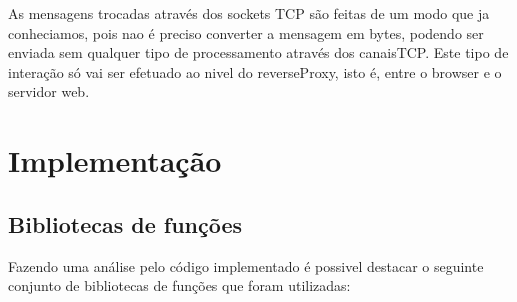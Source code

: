 \documentclass{llncs}
\begin{document}
		As mensagens trocadas através dos sockets TCP são feitas de um modo que ja conheciamos, pois nao é preciso converter a mensagem em bytes, podendo ser enviada sem qualquer tipo de processamento através dos canaisTCP. Este tipo de interação só vai ser efetuado ao nivel do reverseProxy, isto é, entre o browser e o servidor web.




\section{Implementação}
	
	\subsection{Bibliotecas de funções}

		Fazendo uma análise pelo código implementado é possivel destacar o seguinte conjunto de bibliotecas de funções que foram utilizadas:
\end{document}
